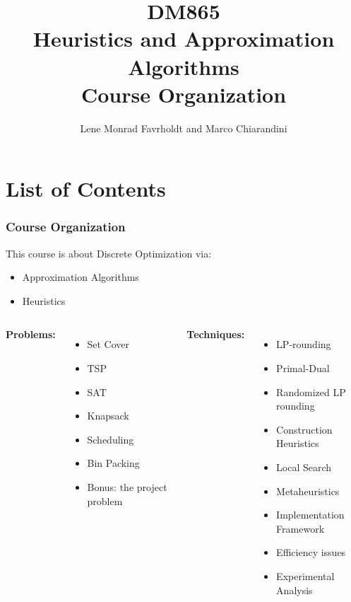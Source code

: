 \documentclass[handout,usepdftitle=false,aspectratio=169,smaller,compress,sans,fleqn,xcolor=dvipsnames,fleqn,table]{beamer}
\title{{\color{black}\normalfont\small DM865}\\
{\color{black}\normalfont\small Heuristics and Approximation Algorithms}\\[2em]
%
Course Organization}
\author{\alert{Lene Monrad Favrholdt} and Marco Chiarandini}
\date{}
\begin{document}
\frame[plain]{%
\titlepage


}
%
%
%


\section{List of Contents}

\begin{frame}%
  \frametitle{Course Organization}

This course is about Discrete Optimization via:
\medskip\begin{itemize}

\item Approximation Algorithms
\item Heuristics 
\end{itemize}


\pause
\begin{columns}[T,onlytextwidth]
\textbf{Problems:}


\begin{itemize}
  \itemsep=1ex
\item Set Cover
\item TSP
\item SAT
\item Knapsack
\item Scheduling
\item Bin Packing
\item Bonus: the project problem
  \end{itemize}


\textbf{Techniques:} 


\begin{itemize}
  \itemsep=1ex
\item LP-rounding
\item Primal-Dual
\item Randomized LP rounding

\medskip
\item Construction Heuristics
\item Local Search
\item Metaheuristics
\item Implementation Framework
\item Efficiency issues
\item Experimental Analysis
  \end{itemize}

\end{columns}

\end{frame}
\end{document}

